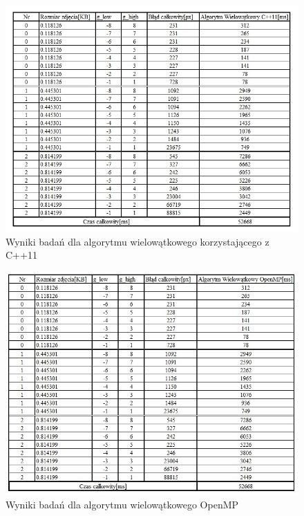 \documentclass[document.tex]{subfiles}
\begin{document}
\begin{figure}[h]
\includegraphics[scale=0.75]{imgs/results_pc_cpp11_threads.jpg}
\caption{Wyniki badań dla algorytmu wielowątkowego korzystającego z C++11}
\label{fig:results_pc_cpp11_threads}
\end{figure}

\begin{figure}[h]
\includegraphics[scale=0.75]{imgs/results_pc_openmp_threads.jpg}
\caption{Wyniki badań dla algorytmu wielowątkowego OpenMP}
\label{fig:results_pc_openmp_threads}
\end{figure}
\end{document}

